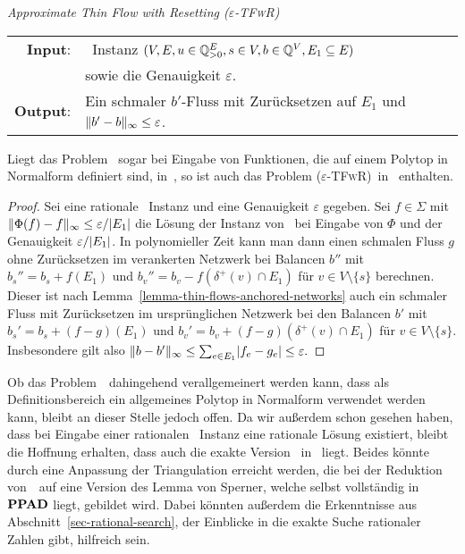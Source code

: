 \newcommand{\epsTFwR}{\textsc{($\varepsilon$\nobreakdash-TFwR)}}
\begin{center}
	\begin{mdframed}
		\centering
		\emph{Approximate Thin Flow with Resetting \epsTFwR} \\[1em]
		\begin{tabular}{rl}
			{\bfseries Input}: &\problemThinFlow\ Instanz $(V, E, u \in \mathbb{Q}^E_{>0}, s\in V, b\in \mathbb{Q}^V, E_1\subseteq E)$\\
				&sowie die Genauigkeit $\varepsilon$.\\
			{\bfseries Output}: &Ein schmaler $b'$-Fluss mit Zurücksetzen auf $E_1$ und $\lVert b' - b\rVert_\infty \leq \varepsilon$.
		\end{tabular}
	\end{mdframed}
\end{center}

\begin{lemma}
	Liegt das Problem \Brouwer\ sogar bei Eingabe von Funktionen, die auf einem Polytop in Normalform definiert sind, in~\PPAD, so ist auch das Problem \epsTFwR\ in \PPAD\ enthalten.
\end{lemma}
\begin{proof}
	Sei eine rationale \problemThinFlow\ Instanz und eine Genauigkeit $\varepsilon$ gegeben.
	Sei $f\in \Sigma$ mit $\lVert\Phi(f) - f\rVert_\infty \leq \varepsilon / \lvert E_1\rvert$ die Lösung der Instanz von \Brouwer\ bei Eingabe von $\Phi$ und der Genauigkeit $\varepsilon/\lvert E_1\rvert$.
	In polynomieller Zeit kann man dann einen schmalen Fluss $g$ ohne Zurücksetzen im verankerten Netzwerk bei Balancen $b''$ mit $b_s'' = b_s + f(E_1)$ und $b_v'' = b_v - f(\delta^+(v)\cap E_1)$ für $v\in V\setminus\{ s \}$ berechnen.
	Dieser ist nach Lemma~\ref{lemma-thin-flows-anchored-networks} auch ein schmaler Fluss mit Zurücksetzen im ursprünglichen Netzwerk bei den Balancen $b'$ mit $b_s' = b_s + (f-g)(E_1)$ und $b_v' = b_v + (f-g)(\delta^+(v)\cap E_1)$ für $v\in V\setminus\{s\}$.
	Insbesondere gilt also 
	\(
	\lVert b - b'\rVert_\infty \leq \sum_{e \in E_1} \lvert f_e - g_e\rvert \leq \varepsilon.
	\)
\end{proof}

Ob das Problem~\Brouwer\ dahingehend verallgemeinert werden kann, dass als Definitionsbereich ein allgemeines Polytop in Normalform verwendet werden kann, bleibt an dieser Stelle jedoch offen.
Da wir außerdem schon gesehen haben, dass bei Eingabe einer rationalen \problemThinFlow\ Instanz eine rationale Lösung existiert, bleibt die Hoffnung erhalten, dass auch die exakte Version \probTFwR\ in \PPAD\ liegt.
Beides könnte durch eine Anpassung der Triangulation erreicht werden, die bei der Reduktion von~\Brouwer\ auf eine Version des Lemma von Sperner, welche selbst vollständig in $\textbf{PPAD}$ liegt, gebildet wird.
Dabei könnten außerdem die Erkenntnisse aus Abschnitt~\ref{sec-rational-search}, der Einblicke in die exakte Suche rationaler Zahlen gibt, hilfreich sein.
